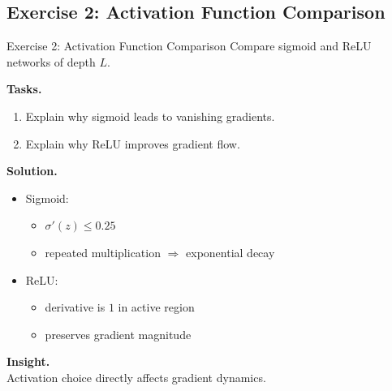 \documentclass[aspectratio=169,11pt]{beamer}
\begin{document}
\subsection{Exercise 2: Activation Function Comparison}
\begin{frame}[t,allowframebreaks]{Exercise 2: Activation Function Comparison}
\small
Compare sigmoid and ReLU networks of depth $L$.

\textbf{Tasks.}\\ \begin{enumerate}
    \item Explain why sigmoid leads to vanishing gradients.
    \item Explain why ReLU improves gradient flow.
\end{enumerate}

\textbf{Solution.}\\ \begin{itemize}
    \item Sigmoid:
    \begin{itemize}
        \item $\sigma'(z) \leq 0.25$
        \item repeated multiplication $\Rightarrow$ exponential decay
    \end{itemize}

    \item ReLU:
    \begin{itemize}
        \item derivative is $1$ in active region
        \item preserves gradient magnitude
    \end{itemize}
\end{itemize}

\textbf{Insight.}\\ Activation choice directly affects gradient dynamics.
\end{frame}
\end{document}
